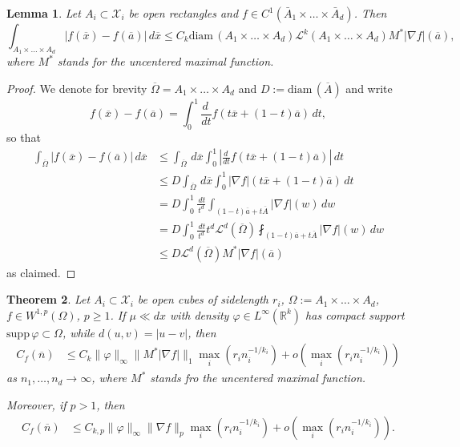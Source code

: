 \documentclass{amsart}
\newtheorem{theorem}{Theorem}[section]
\newtheorem{lemma}[theorem]{Lemma}
\theoremstyle{remark}
\numberwithin{equation}{section}
\numberwithin{figure}{section}
\newcommand{\R}{\mathbb{R}}
\def\supp{\mathrm{supp}\,}
\def\mX{\mathcal{X}}
\def\v{\overline}
\begin{document}
\begin{lemma}\label{lm_estLipMax}
	Let $A_i \subset \mathcal{X}_i$ be open rectangles and $f\in C^1(\bar A_1\times\ldots\times \bar A_d)$. Then 
		\begin{equation*}\label{eq_Estpoincare1a}
	\int_{A_1 \times \ldots \times A_d} |f(\v x)-f(\v a)|\, d\v x \leq C_k\mathrm{diam}\, (A_1 \times \ldots \times A_d) \mathcal{L}^k (A_1 \times \ldots \times A_d) M^*|\nabla f|(\v a),
	\end{equation*}
	where  $M^*$ stands for the uncentered maximal function.
\end{lemma}

\begin{proof}
	We denote for brevity $\v \Omega = A_1 \times \ldots \times A_d$ and $D:=\mathrm{diam}\, (\v A)$ and write
	\[
	f(\v x)-f(\v a)=\int_0^1\frac{d\,}{dt} f(t \v x+(1-t) \v a)\, dt,
	\]
	so that
	\begin{align*}
	\int_{\v \Omega} |f(\v x)-f(\v a)|\, d\v x 
	&\leq \int_{\v \Omega} \, d\v x \int_0^1 \left|\frac{d\,}{dt} f(t \v x+(1-t)\v a)\right|\, dt \\
	& \leq D \int_{\v \Omega} \, d\v x \int_0^1 \left|\nabla f\right|(t \v x+(1-t)\v a)\, dt\\
	& = D \int_0^1 \frac{\,dt}{t^d}\int_{(1-t)\v a +t\v A} \left|\nabla f\right|(w) \, dw\\
	& = D \int_0^1 \frac{\,dt}{t^d} t^d \mathcal{L}^d(\v \Omega) \fint_{(1-t)\v a +t\v A} \left|\nabla f\right|(w) \, dw
	\\& \leq  D \mathcal{L}^d(\v \Omega) M^*|\nabla f| (\v a)
			\end{align*}
			as claimed.
\end{proof}


	\begin{theorem} 
		Let $A_i\subset \mX_i$ be open cubes of sidelength $r_i$,
		$\Omega:= A_1 \times \ldots \times A_d$,
		$f\in W^{1,p}(\Omega)$, $p\geq 1$.		
	If $\mu\ll dx$ with density $\varphi\in L^\infty(\R^k)$ has compact support $\supp \varphi \subset \Omega$, while  $d(u, v) = |u-v|$, then
\begin{equation}\label{eq_upestSobolev1}
\begin{aligned}
C_f(\v n)&\leq 
C_k \|\varphi\|_\infty \|M^*|\nabla f|\|_1 \max_i (r_i n_i^{-1/k_i})
+ o\left( \max_i (r_i n_i^{-1/k_i})\right) 
\end{aligned}
\end{equation}
as $n_1, \ldots, n_d \to\infty$, where $M^*$ stands fro the uncentered maximal function.
 
Moreover, if $p>1$, then  
\begin{equation}\label{eq_upestSobolev2}
\begin{aligned}
C_f(\v n)&\leq 
C_{k,p} \|\varphi\|_\infty \|\nabla f\|_p \max_i (r_i n_i^{-1/k_i}) + o\left( \max_i (r_i n_i^{-1/k_i})\right). 
\end{aligned}
\end{equation}
\end{theorem}	
\end{document}

